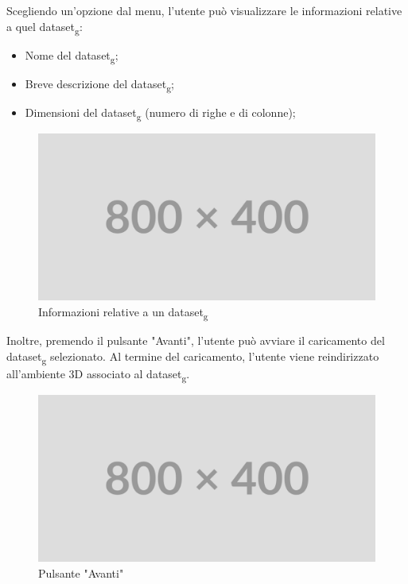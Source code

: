 Scegliendo un'opzione dal menu, l'utente può visualizzare le informazioni
relative a quel dataset\textsubscript{g}:
\begin{itemize}
    \item Nome del dataset\textsubscript{g};
    \item Breve descrizione del dataset\textsubscript{g};
    \item Dimensioni del dataset\textsubscript{g} (numero di righe e di colonne);
\end{itemize}
\begin{figure}[ht!]
    \centering
    \includegraphics[scale=0.4]{template/images/placeholder.png}
    \caption{Informazioni relative a un dataset\textsubscript{g}}
\end{figure}
Inoltre, premendo il pulsante "Avanti", l'utente può avviare il caricamento del
dataset\textsubscript{g} selezionato. Al termine del caricamento, l'utente viene reindirizzato
all'ambiente 3D associato al dataset\textsubscript{g}.
\begin{figure}[ht!]
    \centering
    \includegraphics[scale=0.4]{template/images/placeholder.png}
    \caption{Pulsante "Avanti"}
\end{figure}

